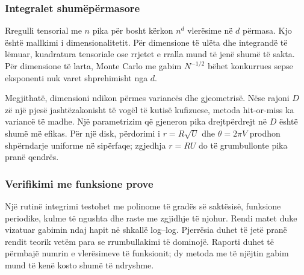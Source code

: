 \subsubsection{Integralet shumëpërmasore}
Rregulli tensorial me $n$ pika për bosht kërkon $n^d$ vlerësime në $d$ përmasa. Kjo është mallkimi i dimensionalitetit. Për dimensione të ulëta dhe integrandë të lëmuar, kuadratura tensoriale ose rrjetet e rralla mund të jenë shumë të sakta. Për dimensione të larta, Monte Carlo me gabim $N^{-1/2}$ bëhet konkurrues sepse eksponenti nuk varet shprehimisht nga $d$.

Megjithatë, dimensioni ndikon përmes variancës dhe gjeometrisë. Nëse rajoni $D$ zë një pjesë jashtëzakonisht të vogël të kutisë kufizuese, metoda hit-or-miss ka variancë të madhe. Një parametrizim që gjeneron pika drejtpërdrejt në $D$ është shumë më efikas. Për një disk, përdorimi i $r=R\sqrt U$ dhe $\theta=2\pi V$ prodhon shpërndarje uniforme në sipërfaqe; zgjedhja $r=RU$ do të grumbullonte pika pranë qendrës.

\subsubsection{Verifikimi me funksione prove}
Një rutinë integrimi testohet me polinome të gradës së saktësisë, funksione periodike, kulme të ngushta dhe raste me zgjidhje të njohur. Rendi matet duke vizatuar gabimin ndaj hapit në shkallë log--log. Pjerrësia duhet të jetë pranë rendit teorik vetëm para se rrumbullakimi të dominojë. Raporti duhet të përmbajë numrin e vlerësimeve të funksionit; dy metoda me të njëjtin gabim mund të kenë kosto shumë të ndryshme.
